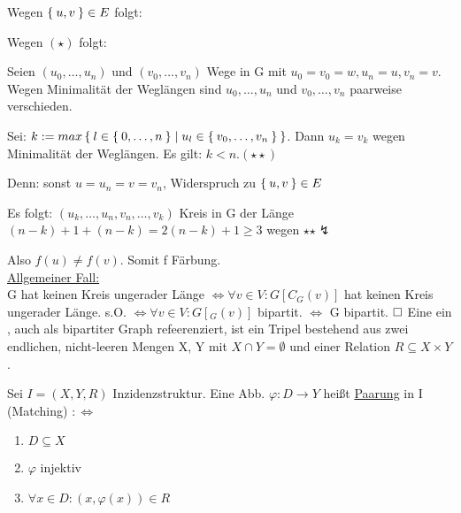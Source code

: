 \documentclass{../../meta/tudscript}
\begin{document}

        Wegen $\Set{u, v} \in E$ folgt:

        Wegen $(\star)$ folgt: 

        Seien $(u_0, \ldots, u_n)$ und $(v_0, \ldots, v_n)$ Wege in G mit 
        $u_0 = v_0 = w, u_n = u, v_n = v$.
        \\
        
        Wegen Minimalität der Weglängen sind $u_0, \ldots, u_n$ und 
        $v_0, \ldots, v_n $ paarweise verschieden.
        
        Sei: $k := max \Set{l \in \Set{0, \ldots, n} \mid u_l \in \Set{v_0, \ldots, v_n}}$.
        Dann $u_k = v_k$ wegen Minimalität der Weglängen. Es gilt: $k < n. (\star\star)$

        Denn: sonst $u = u_n = v = v_n$, Widerspruch zu $\Set{u, v} \in E$ \lightning 
        
        Es folgt: $(u_k, \ldots, u_n, v_n, \ldots, v_k)$ Kreis in G der Länge 
        $(n-k) + 1 + (n-k) = 2(n-k) + 1 \geq 3$ wegen $\star\star \lightning$

        Also $f (u) \neq f (v)$. Somit f Färbung. \\ 
        \underline{Allgemeiner Fall:} \\
        
        G hat keinen Kreis ungerader Länge $\iff \forall v \in V: G [C_G (v)] $ hat keinen Kreis ungerader Länge.
        s.O. $\iff \forall v \in V: G [_G (v)]$ bipartit. $\iff$ G bipartit. $\hfill\square$
        Eine  ein , auch als
        bipartiter Graph refeerenziert, ist ein Tripel
        bestehend aus zwei endlichen, nicht-leeren Mengen X, Y mit $X \cap Y = \emptyset$ und einer Relation $R \subseteq X \times Y$.
        
        Sei $I = (X, Y , R)$ Inzidenzstruktur. Eine Abb. $\varphi: D \rightarrow Y$ heißt \underline{Paarung} in I (Matching) $:\iff$
        \begin{enumerate}
        \item $D \subseteq X$
        \item $\varphi$ injektiv
        \item $\forall x \in D: (x, \varphi (x)) \in R$
        \end{enumerate}
\end{document}
